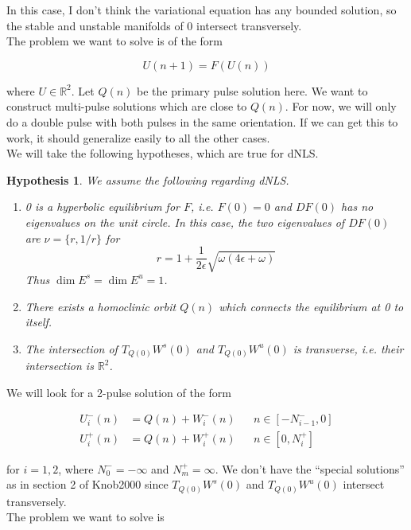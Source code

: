 \documentclass[12pt]{article}
\def\R{{\mathbb R}}
\newtheorem{hypothesis}{Hypothesis}
\begin{document}
In this case, I don't think the variational equation has any bounded solution, so the stable and unstable manifolds of 0 intersect transversely.\\

The problem we want to solve is of the form 

\begin{equation}\label{diffeq}
U(n+1) = F(U(n))
\end{equation}

where $U \in \R^2$. Let $Q(n)$ be the primary pulse solution here. We want to construct multi-pulse solutions which are close to $Q(n)$. For now, we will only do a double pulse with both pulses in the same orientation. If we can get this to work, it should generalize easily to all the other cases. \\

We will take the following hypotheses, which are true for dNLS.

\begin{hypothesis}\label{2hyp}
We assume the following regarding dNLS.
\begin{enumerate}[(0)]
\item 0 is a hyperbolic equilibrium for $F$, i.e. $F(0) = 0$ and $DF(0)$ has no eigenvalues on the unit circle. In this case, the two eigenvalues of $DF(0)$ are $\nu = \{ r, 1/r \}$ for
\[
r = 1 + \frac{1}{2\epsilon}\sqrt{ \omega(4 \epsilon + \omega)}
\]
Thus $\dim E^s = \dim E^u = 1$.
\item There exists a homoclinic orbit $Q(n)$ which connects the equilibrium at 0 to itself.
\item The intersection of $T_{Q(0)} W^s(0)$ and $T_{Q(0)}W^u(0)$ is transverse, i.e. their intersection is $\R^2$. 
\end{enumerate}
\end{hypothesis}

We will look for a 2-pulse solution of the form

\begin{align*}
U_i^-(n) &= Q(n) + W_i^-(n) && n \in [-N_{i-1}^-, 0] \\
U_i^+(n) &= Q(n) + W_i^+(n) && n \in [0, N_i^+]
\end{align*}

for $i = 1, 2$, where $N_0^- = -\infty$ and $N_m^+ = \infty$. We don't have the ``special solutions'' as in section 2 of Knob2000 since $T_{Q(0)} W^s(0)$ and $T_{Q(0)}W^u(0)$ intersect transversely.\\

The problem we want to solve is
\end{document}
